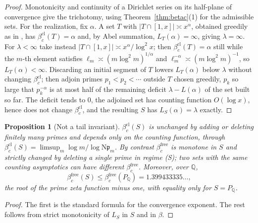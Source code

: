 \documentclass[11pt]{amsart}
\numberwithin{equation}{section}
\newtheorem{proposition}[theorem]{Proposition}
\theoremstyle{definition}
\theoremstyle{remark}
\newcommand{\Q}{\mathbb{Q}}
\newcommand{\pp}{\mathfrak{p}}
\newcommand{\Ns}{\mathrm{N}}
\newcommand{\bfree}{\beta_c^{\mathrm{free}}}
\newcommand{\bcl}{\beta_c^{\mathrm{cl}}}
\begin{document}
\begin{proof}
Monotonicity and continuity of a Dirichlet series on its half-plane of convergence give the
trichotomy, using Theorem~\ref{thm:betac}(1) for the admissible sets. For the realization,
fix $\alpha$. A set $T$ with $|T\cap[1,x]|\asymp x^\alpha$, obtained greedily as in
\cite[Lem.~5.4]{SeriesI}, has $\bcl(T)=\alpha$ and, by Abel summation, $L_T(\alpha)=\infty$,
giving $\lambda=\infty$. For $\lambda<\infty$ take instead
$|T\cap[1,x]|\asymp x^\alpha/\log^2x$; then $\bcl(T)=\alpha$ still while the $m$-th element
satisfies $\ell_m\asymp(m\log^2m)^{1/\alpha}$ and $\ell_m^{-\alpha}\asymp(m\log^2m)^{-1}$, so
$L_T(\alpha)<\infty$. Discarding an initial segment of $T$ lowers $L_T(\alpha)$ below
$\lambda$ without changing $\bcl$; then adjoin primes $p_1<p_2<\cdots$ outside $T$ chosen
greedily, $p_k$ so large that $p_k^{-\alpha}$ is at most half of the remaining deficit
$\lambda-L(\alpha)$ of the set built so far. The deficit tends to $0$, the adjoined set has
counting function $O(\log x)$, hence does not change $\bcl$, and the resulting $S$ has
$L_S(\alpha)=\lambda$ exactly.
\end{proof}

\begin{proposition}[Not a tail invariant]\label{prop:tail}
$\bcl(S)$ is unchanged by adding or deleting finitely many primes and depends only on the
counting function, through $\bcl(S)=\limsup_m\log m/\log\Ns\pp_m$. By contrast $\bfree$ is
monotone in $S$ and strictly changed by deleting a single prime in regime (S); two sets with
the same counting asymptotics can have different $\bfree$. Moreover, over $\Q$,
\[
\bfree(S)\le\bfree(P_\Q)=1.399433335\ldots ,
\]
the root of the prime zeta function minus one, with equality only for $S=P_\Q$.
\end{proposition}

\begin{proof}
The first is the standard formula for the convergence exponent. The rest follows from strict
monotonicity of $L_S$ in $S$ and in $\beta$.
\end{proof}
\end{document}
